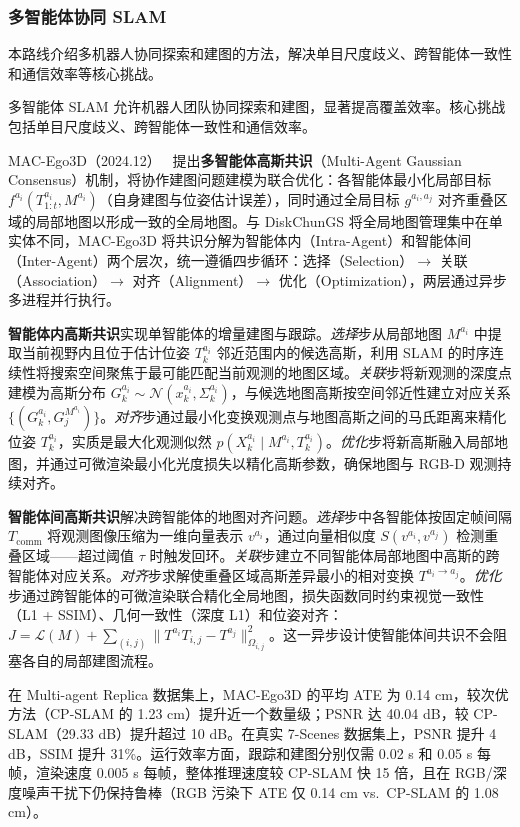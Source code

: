 \subsubsection{多智能体协同 SLAM}

本路线介绍多机器人协同探索和建图的方法，解决单目尺度歧义、跨智能体一致性和通信效率等核心挑战。

多智能体 SLAM 允许机器人团队协同探索和建图，显著提高覆盖效率。核心挑战包括单目尺度歧义、跨智能体一致性和通信效率。

MAC-Ego3D（2024.12）~\cite{2412_09723} 提出\textbf{多智能体高斯共识}（Multi-Agent Gaussian Consensus）机制，将协作建图问题建模为联合优化：各智能体最小化局部目标 $f^{a_i}(T_{1:t}^{a_i}, M^{a_i})$（自身建图与位姿估计误差），同时通过全局目标 $g^{a_i,a_j}$ 对齐重叠区域的局部地图以形成一致的全局地图。与 DiskChunGS 将全局地图管理集中在单实体不同，MAC-Ego3D 将共识分解为智能体内（Intra-Agent）和智能体间（Inter-Agent）两个层次，统一遵循四步循环：选择（Selection）$\to$ 关联（Association）$\to$ 对齐（Alignment）$\to$ 优化（Optimization），两层通过异步多进程并行执行。

\textbf{智能体内高斯共识}实现单智能体的增量建图与跟踪。\textit{选择}步从局部地图 $M^{a_i}$ 中提取当前视野内且位于估计位姿 $T_k^{a_i}$ 邻近范围内的候选高斯，利用 SLAM 的时序连续性将搜索空间聚焦于最可能匹配当前观测的地图区域。\textit{关联}步将新观测的深度点建模为高斯分布 $G_k^{a_i} \sim \mathcal{N}(x_k^{a_i}, \Sigma_k^{a_i})$，与候选地图高斯按空间邻近性建立对应关系 $\{(G_k^{a_i}, G_j^{M^{a_i}})\}$。\textit{对齐}步通过最小化变换观测点与地图高斯之间的马氏距离来精化位姿 $T_k^{a_i}$，实质是最大化观测似然 $p(X_k^{a_i} \mid M^{a_i}, T_k^{a_i})$。\textit{优化}步将新高斯融入局部地图，并通过可微渲染最小化光度损失以精化高斯参数，确保地图与 RGB-D 观测持续对齐。

\textbf{智能体间高斯共识}解决跨智能体的地图对齐问题。\textit{选择}步中各智能体按固定帧间隔 $T_{\mathrm{comm}}$ 将观测图像压缩为一维向量表示 $v^{a_i}$，通过向量相似度 $S(v^{a_i}, v^{a_j})$ 检测重叠区域——超过阈值 $\tau$ 时触发回环。\textit{关联}步建立不同智能体局部地图中高斯的跨智能体对应关系。\textit{对齐}步求解使重叠区域高斯差异最小的相对变换 $T^{a_i \to a_j}$。\textit{优化}步通过跨智能体的可微渲染联合精化全局地图，损失函数同时约束视觉一致性（L1 + SSIM）、几何一致性（深度 L1）和位姿对齐：$J = \mathcal{L}(M) + \sum_{(i,j)} \|T^{a_i} T_{i,j} - T^{a_j}\|_{\Omega_{i,j}}^2$。这一异步设计使智能体间共识不会阻塞各自的局部建图流程。

在 Multi-agent Replica 数据集上，MAC-Ego3D 的平均 ATE 为 0.14 cm，较次优方法（CP-SLAM 的 1.23 cm）提升近一个数量级；PSNR 达 40.04 dB，较 CP-SLAM（29.33 dB）提升超过 10 dB。在真实 7-Scenes 数据集上，PSNR 提升 4 dB，SSIM 提升 31\%。运行效率方面，跟踪和建图分别仅需 0.02 s 和 0.05 s 每帧，渲染速度 0.005 s 每帧，整体推理速度较 CP-SLAM 快 15 倍，且在 RGB/深度噪声干扰下仍保持鲁棒（RGB 污染下 ATE 仅 0.14 cm vs.\ CP-SLAM 的 1.08 cm）。

